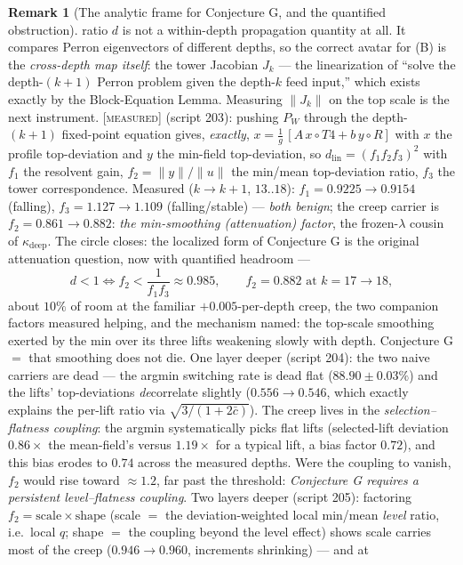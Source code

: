 \documentclass[11pt]{article}
\theoremstyle{definition}
\newtheorem{remark}[theorem]{Remark}
\newcommand{\MEASURED}{\textup{[\textsc{measured}]}}
\newcommand{\lam}{\lambda}
\begin{document}
\begin{remark}[The analytic frame for Conjecture G, and the quantified
obstruction]
{ratio $d$ is not a within-depth propagation quantity at all}. It
compares Perron eigenvectors of different depths, so the correct
avatar for (B) is the \emph{cross-depth map itself}: the tower
Jacobian $J_k$ --- the linearization of ``solve the depth-$(k{+}1)$
Perron problem given the depth-$k$ feed input,'' which exists exactly
by the Block-Equation Lemma. Measuring $\|J_k\|$ on the top scale is
the next instrument.
\MEASURED{} (script 203): pushing $P_W$ through the depth-$(k{+}1)$
fixed-point equation gives, \emph{exactly},
$x = \tfrac1g\,[A\,x\!\circ\!T4 + b\,y\!\circ\!R]$ with $x$ the profile
top-deviation and $y$ the min-field top-deviation, so
$d_{\mathrm{lin}} = (f_1 f_2 f_3)^2$ with $f_1$ the resolvent gain,
$f_2 = \|y\|/\|u\|$ the min/mean top-deviation ratio, $f_3$ the tower
correspondence. Measured ($k \to k{+}1$, $13..18$):
$f_1 = 0.9225 \to 0.9154$ (falling), $f_3 = 1.127 \to 1.109$
(falling/stable) --- \emph{both benign}; the creep carrier is
$f_2 = 0.861 \to 0.882$: \emph{the min-smoothing (attenuation)
factor}, the frozen-$\lam$ cousin of $\kappa_{\mathrm{deep}}$. The
circle closes: the localized form of Conjecture G is the original
attenuation question, now with quantified headroom ---
\[
d < 1 \iff f_2 < \frac{1}{f_1 f_3} \approx 0.985,
\qquad f_2 = 0.882 \text{ at } k = 17{\to}18,
\]
about $10\%$ of room at the familiar $+0.005$-per-depth creep, the two
companion factors measured helping, and the mechanism named: the
top-scale smoothing exerted by the min over its three lifts weakening
slowly with depth. Conjecture G $=$ that smoothing does not die.
One layer deeper (script 204): the two naive carriers are dead --- the
argmin switching rate is dead flat ($88.90 \pm 0.03\%$) and the lifts'
top-deviations \emph{de}correlate slightly ($0.556 \to 0.546$, which
exactly explains the per-lift ratio via $\sqrt{3/(1+2\bar c)}$). The
creep lives in the \emph{selection--flatness coupling}: the argmin
systematically picks flat lifts (selected-lift deviation $0.86\times$
the mean-field's versus $1.19\times$ for a typical lift, a bias factor
$0.72$), and this bias erodes to $0.74$ across the measured depths.
Were the coupling to vanish, $f_2$ would rise toward $\approx 1.2$,
far past the threshold: \emph{Conjecture G requires a persistent
level--flatness coupling}. Two layers deeper (script 205): factoring
$f_2 = \mathrm{scale} \times \mathrm{shape}$ (scale $=$ the
deviation-weighted local min/mean \emph{level} ratio, i.e.\ local $q$;
shape $=$ the coupling beyond the level effect) shows scale carries
most of the creep ($0.946 \to 0.960$, increments shrinking) --- and at

\end{remark}
\end{document}
